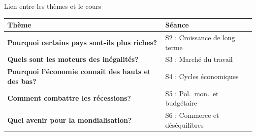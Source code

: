 \documentclass[aspectratio=169]{beamer}
\begin{document}

\begin{frame}{Lien entre les th\`emes et le cours}
   \renewcommand{\arraystretch}{1.5}
   \centering
   \small
   \begin{tabularx}{0.92\textwidth}{>{\bfseries}X l}
      \toprule
      \textbf{Th\`eme} & \textbf{S\'eance} \\
      \midrule
      Pourquoi certains pays sont-ils plus riches? & S2 : Croissance de long terme \\
      Quels sont les moteurs des in\'egalit\'es? & S3 : March\'e du travail \\
      Pourquoi l'\'economie conna\^it des hauts et des bas? & S4 : Cycles \'economiques \\
      Comment combattre les r\'ecessions? & S5 : Pol.\ mon.\ et budg\'etaire \\
      Quel avenir pour la mondialisation? & S6 : Commerce et d\'es\'equilibres \\
      \bottomrule
   \end{tabularx}
\end{frame}
\end{document}
